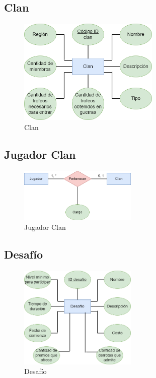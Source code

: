 \subsection*{Clan}
\begin{figure}[H]
\centering
\includegraphics[width=0.60\textwidth]{../images/merx_clan.png}
\caption{Clan}
\end{figure}

\subsection*{Jugador Clan}
\begin{figure}[H]
\centering
\includegraphics[width=0.5\textwidth]{../images/merx_playerclan.png}
\caption{Jugador Clan}
\end{figure}

\subsection*{Desafío}
\begin{figure}[H]
\centering
\includegraphics[width=0.5\textwidth]{../images/merx_challenge.png}
\caption{Desafío}
\end{figure}

